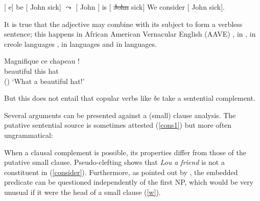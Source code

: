 \eal
\ex
\label{rais-transformational}
{}[ e] be [ John sick] $\leadsto$  [ John ] is  [ \st{John} sick]
\ex
\label{ecm}
We consider [ John sick].
\zl

It is true that the adjective may combine with its subject to form a verbless sentence; this happens
in African American Vernacular English (AAVE) \citep{Bender2001a}\addpages, in  \citep{Laurens2008}\addpages, in creole languages
\citep[134]{HenriandAbeille2007}, in  languages \citep{Zec87a-u}\addpages and in  languages.

\ea
\gll Magnifique ce chapeau !\\
     beautiful this hat\\\hfill{()}
\glt `What a beautiful hat!'
\z

\noindent
But this does not entail that copular verbs like \emph{be} take a sentential complement. 




Several arguments can be presented against a (small) clause
analysis. The putative sentential source is sometimes attested (\ref{cons1}) but more often
ungrammatical:
	
\eal
{}
\zl

	
When a clausal complement is possible, its properties differ from those of the putative small
clause. Pseudo-clefting shows that \textit{Lou a friend} is not a constituent in
(\ref{consider}). Furthermore, as pointed out by \citet{Williams83a}, the embedded predicate can be
questioned independently of the first NP, which would be very unusual if it were the head of a small
clause (\ref{w}). 

